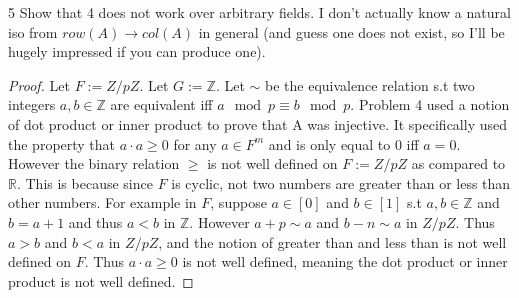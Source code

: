\documentclass{article}
\newcommand{\R}{\mathbb{R}}
\newcommand{\Z}{\mathbb{Z}}
\newcommand{\rarr}[0]{\rightarrow}
\begin{document}
\begin{PROB}{5}\label{Problem 5.}
	Show that 4 does not work over arbitrary fields. I don't actually know a natural iso from $row(A) \rarr col(A)$ in general (and guess one does not exist, so I'll be hugely impressed if you can produce one).
\end{PROB}
\begin{proof}
	Let $F := Z/pZ$. Let $G := \Z$. Let $\sim$ be the equivalence relation s.t two integers $a, b \in \Z$ are equivalent iff $a \mod p \equiv b \mod p$. Problem 4 used a notion of dot product or inner product to prove that A was injective. It specifically used the property that $a \cdot a \geq 0$ for any $a \in F^m$ and is only equal to 0 iff $a = 0$. However the binary relation $\geq$ is not well defined on $F := Z/pZ$ as compared to $\R$. This is because since $F$ is cyclic, not two numbers are greater than or less than other numbers. For example in $F$, suppose $a \in [0]$ and $b \in [1]$ s.t $a, b \in \Z$ and $b = a + 1$ and thus $a < b$ in $\Z$. However $a + p \sim a$ and $b - n \sim a$ in $Z/pZ$. Thus $a > b$ and $b < a$ in $Z/pZ$, and the notion of greater than and less than is not well defined on $F$. Thus $a \cdot a \geq 0$ is not well defined, meaning the dot product or inner product is not well defined. 
\end{proof}
\end{document}
